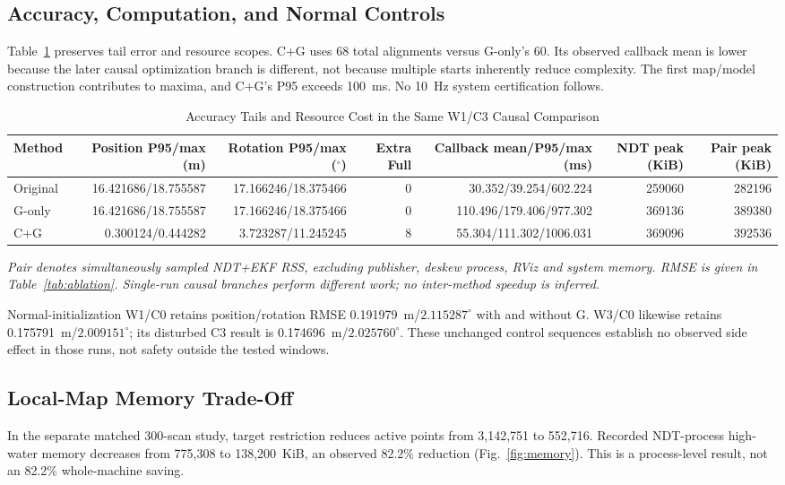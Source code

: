 \documentclass[journal,10pt,letterpaper]{IEEEtran}
\begin{document}
\subsection{Accuracy, Computation, and Normal Controls}
Table~\ref{tab:resources} preserves tail error and resource scopes. C+G uses 68 total alignments versus G-only's 60. Its observed callback mean is lower because the later causal optimization branch is different, not because multiple starts inherently reduce complexity. The first map/model construction contributes to maxima, and C+G's P95 exceeds 100~ms. No 10~Hz system certification follows.

\begin{table}[t]
\caption{Accuracy Tails and Resource Cost in the Same W1/C3 Causal Comparison}
\label{tab:resources}
\centering\footnotesize
\begin{tabular}{lrrrrrr}
\toprule
Method & Position P95/max (m) & Rotation P95/max ($^\circ$) & Extra Full & Callback mean/P95/max (ms) & NDT peak (KiB) & Pair peak (KiB) \\
\midrule
Original &16.421686/18.755587&17.166246/18.375466&0&30.352/39.254/602.224&259060&282196\\
G-only &16.421686/18.755587&17.166246/18.375466&0&110.496/179.406/977.302&369136&389380\\
C+G &0.300124/0.444282&3.723287/11.245245&8&55.304/111.302/1006.031&369096&392536\\
\bottomrule
\end{tabular}
\par\smallskip\raggedright
\textit{Pair denotes simultaneously sampled NDT+EKF RSS, excluding publisher, deskew process, RViz and system memory. RMSE is given in Table~\ref{tab:ablation}. Single-run causal branches perform different work; no inter-method speedup is inferred.}
\end{table}

Normal-initialization W1/C0 retains position/rotation RMSE 0.191979~m/$2.115287^\circ$ with and without G. W3/C0 likewise retains 0.175791~m/$2.009151^\circ$; its disturbed C3 result is 0.174696~m/$2.025760^\circ$. These unchanged control sequences establish no observed side effect in those runs, not safety outside the tested windows.

\subsection{Local-Map Memory Trade-Off}
In the separate matched 300-scan study, target restriction reduces active points from 3,142,751 to 552,716. Recorded NDT-process high-water memory decreases from 775,308 to 138,200~KiB, an observed 82.2\% reduction (Fig.~\ref{fig:memory}). This is a process-level result, not an 82.2\% whole-machine saving.
\end{document}
